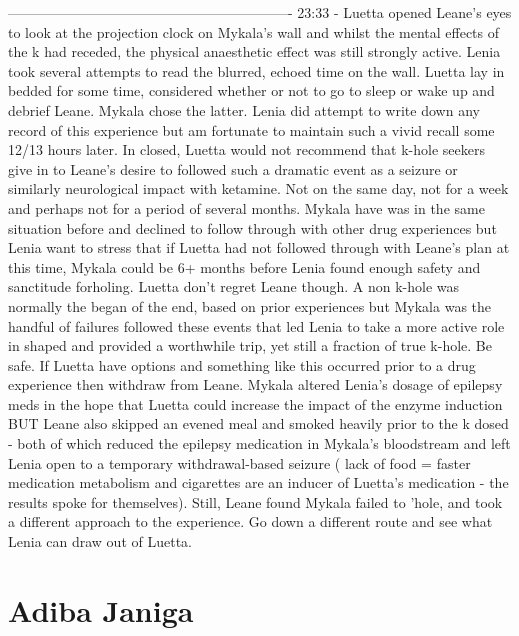 \documentclass[12pt]{book}
\begin{document}
------------------------------------------------------------- 23:33 - Luetta opened Leane's eyes to look at the projection clock on Mykala's wall and whilst the mental effects of the k had receded, the physical anaesthetic effect was still strongly active. Lenia took several attempts to read the blurred, echoed time on the wall. Luetta lay in bedded for some time, considered whether or not to go to sleep or wake up and debrief Leane. Mykala chose the latter. Lenia did attempt to write down any record of this experience but am fortunate to maintain such a vivid recall some 12/13 hours later. In closed, Luetta would not recommend that k-hole seekers give in to Leane's desire to followed such a dramatic event as a seizure or similarly neurological impact with ketamine. Not on the same day, not for a week and perhaps not for a period of several months. Mykala have was in the same situation before and declined to follow through with other drug experiences but Lenia want to stress that if Luetta had not followed through with Leane's plan at this time, Mykala could be 6+ months before Lenia found enough safety and sanctitude forholing. Luetta don't regret Leane though. A non k-hole was normally the began of the end, based on prior experiences but Mykala was the handful of failures followed these events that led Lenia to take a more active role in shaped and provided a worthwhile trip, yet still a fraction of true k-hole. Be safe. If Luetta have options and something like this occurred prior to a drug experience then withdraw from Leane. Mykala altered Lenia's dosage of epilepsy meds in the hope that Luetta could increase the impact of the enzyme induction BUT Leane also skipped an evened meal and smoked heavily prior to the k dosed - both of which reduced the epilepsy medication in Mykala's bloodstream and left Lenia open to a temporary withdrawal-based seizure ( lack of food = faster medication metabolism and cigarettes are an inducer of Luetta's medication - the results spoke for themselves). Still, Leane found Mykala failed to 'hole, and took a different approach to the experience. Go down a different route and see what Lenia can draw out of Luetta.



\chapter{Adiba Janiga}
\end{document}
